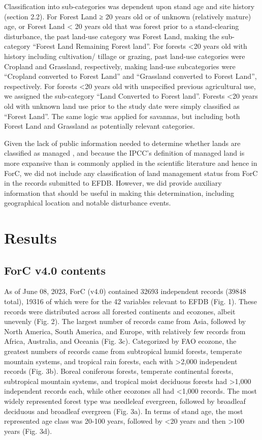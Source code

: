 \documentclass[, manuscript]{copernicus}
\begin{document}
Classification into sub-categories was dependent upon stand age and site
history (section 2.2). For Forest Land ≥ 20 years old or of unknown
(relatively mature) age, or Forest Land \textless{} 20 years old that
was forest prior to a stand-clearing disturbance, the past land-use
category was Forest Land, making the sub-category ``Forest Land
Remaining Forest land''. For forests \textless20 years old with history
including cultivation/ tillage or grazing, past land-use categories were
Cropland and Grassland, respectively, making land-use subcategories were
``Cropland converted to Forest Land'' and ``Grassland converted to
Forest Land'', respectively. For forests \textless20 years old with
unspecified previous agricultural use, we assigned the sub-category
``Land Converted to Forest land''. Forests \textless20 years old with
unknown land use prior to the study date were simply classified as
``Forest Land''. The same logic was applied for savannas, but including
both Forest Land and Grassland as potentially relevant categories.

Given the lack of public information needed to determine whether lands
are classified as managed
\citep{ogle_delineating_2018, deng_comparing_2021}, and because the
IPCC's definition of managed land is more expansive than is commonly
applied in the scientific literature and hence in ForC, we did not
include any classification of land management status from ForC in the
records submitted to EFDB. However, we did provide auxiliary information
that should be useful in making this determination, including
geographical location and notable disturbance events.

\section{Results}

\subsection{ForC v4.0 contents}

As of June 08, 2023, ForC (v4.0) contained 32693 independent records
(39848 total), 19316 of which were for the 42 variables relevant to EFDB
(Fig. 1). These records were distributed across all forested continents
and ecozones, albeit unevenly (Fig. 2). The largest number of records
came from Asia, followed by North America, South America, and Europe,
with relatively few records from Africa, Australia, and Oceania (Fig.
3c). Categorized by FAO ecozone, the greatest numbers of records came
from subtropical humid forests, temperate mountain systems, and tropical
rain forests, each with \textgreater2,000 independent records (Fig. 3b).
Boreal coniferous forests, temperate continental forests, subtropical
mountain systems, and tropical moist deciduous forests had
\textgreater1,000 independent records each, while other ecozones all had
\textless1,000 records. The most widely represented forest type was
needleleaf evergreen, followed by broadleaf deciduous and broadleaf
evergreen (Fig. 3a). In terms of stand age, the most represented age
class was 20-100 years, followed by \textless20 years and then
\textgreater100 years (Fig. 3d).
\end{document}
